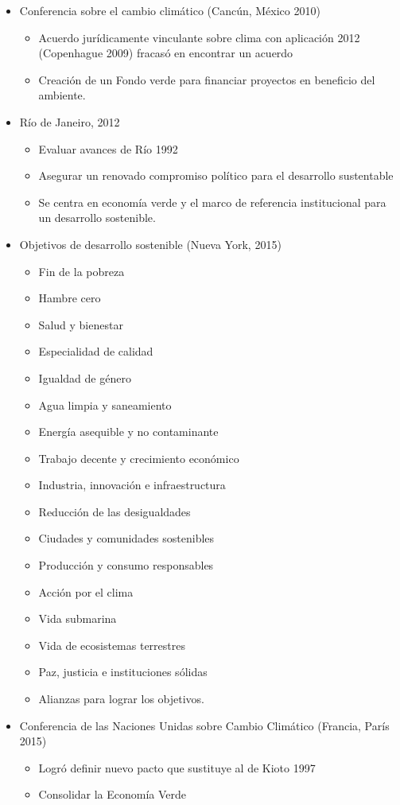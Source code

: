 \begin{itemize}
\begin{itemize}
    \end{itemize}
    \item Conferencia sobre el cambio climático (Cancún, México 2010) \begin{itemize}
        \item Acuerdo jurídicamente vinculante sobre clima con aplicación 2012 (Copenhague 2009) fracasó en encontrar un acuerdo
        \item Creación de un Fondo verde para financiar proyectos en beneficio del ambiente.
    \end{itemize}
    \item Río de Janeiro, 2012 \begin{itemize}
        \item Evaluar avances de Río 1992
        \item Asegurar un renovado compromiso político para el desarrollo sustentable
        \item Se centra en economía verde y el marco de referencia institucional para un desarrollo sostenible.
    \end{itemize}
    \item Objetivos de desarrollo sostenible (Nueva York, 2015) \begin{itemize}
        \item Fin de la pobreza
        \item Hambre cero
        \item Salud y bienestar
        \item Especialidad de calidad
        \item Igualdad de género
        \item Agua limpia y saneamiento
        \item Energía asequible y no contaminante
        \item Trabajo decente y crecimiento económico
        \item Industria, innovación e infraestructura
        \item Reducción de las desigualdades
        \item Ciudades y comunidades sostenibles
        \item Producción y consumo responsables
        \item Acción por el clima
        \item Vida submarina
        \item Vida de ecosistemas terrestres
        \item Paz, justicia e instituciones sólidas
        \item Alianzas para lograr los objetivos.
    \end{itemize}
    \item Conferencia de las Naciones Unidas sobre Cambio Climático (Francia, París 2015) \begin{itemize}
        \item Logró definir nuevo pacto que sustituye al de Kioto 1997
        \item Consolidar la Economía Verde
    \end{itemize}
\end{itemize}
